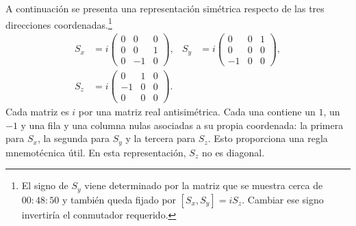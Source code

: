 A continuación se presenta una representación simétrica respecto de las tres direcciones coordenadas.\footnote{El signo de \(S_y\) viene determinado por la matriz que se muestra cerca de \(00{:}48{:}50\) y también queda fijado por \([S_x,S_y]=iS_z\). Cambiar ese signo invertiría el conmutador requerido.}
\begin{equation}
\begin{aligned}
S_x
&=
i
\begin{pmatrix}
0&0&0\\
0&0&1\\
0&-1&0
\end{pmatrix},
&
S_y
&=
i
\begin{pmatrix}
0&0&1\\
0&0&0\\
-1&0&0
\end{pmatrix},\\
S_z
&=
i
\begin{pmatrix}
0&1&0\\
-1&0&0\\
0&0&0
\end{pmatrix}.
\end{aligned}
\end{equation}
Cada matriz es \(i\) por una matriz real antisimétrica. Cada una contiene un \(1\), un \(-1\) y una fila y una columna nulas asociadas a su propia coordenada: la primera para \(S_x\), la segunda para \(S_y\) y la tercera para \(S_z\). Esto proporciona una regla mnemotécnica útil. En esta representación, \(S_z\) no es diagonal.


